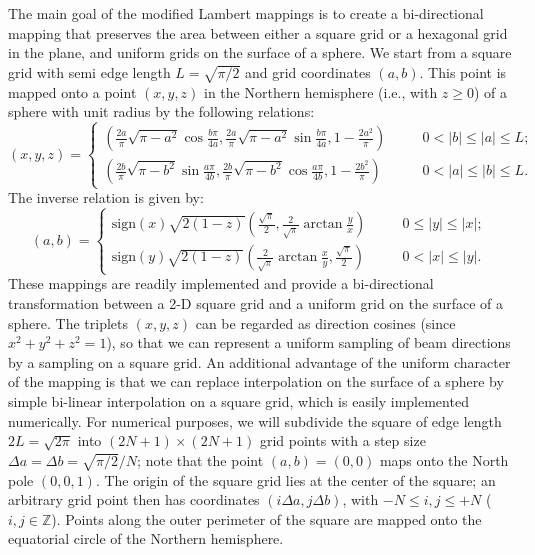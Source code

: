 \documentclass[DIV=calc, paper=letter, fontsize=11pt]{scrartcl}	 %
\begin{document}
The main goal of the modified Lambert mappings is to create a bi-directional mapping that preserves the area between either a square grid or a hexagonal
grid in the plane, and uniform grids on the surface of a sphere.  
We start from a square grid with semi edge length $L=\sqrt{\pi/2}$ and grid coordinates $(a,b)$.  This point is mapped onto a point $(x,y,z)$ 
in the Northern hemisphere (i.e., with $z\ge 0$) of a sphere with unit radius by the following relations:
\begin{equation}
	(x,y,z) = \left\{\begin{array}{lcl}
	\left(\frac{2a}{\pi}\sqrt{\pi-a^2}\cos\frac{b\pi}{4a},\frac{2a}{\pi}\sqrt{\pi-a^2}\sin\frac{b\pi}{4a},1-\frac{2a^2}{\pi}\right) & \quad & 0 < \vert b\vert \le\vert a\vert\le L;\\
	\left(\frac{2b}{\pi}\sqrt{\pi-b^2}\sin\frac{a\pi}{4b},\frac{2b}{\pi}\sqrt{\pi-b^2}\cos\frac{a\pi}{4b},1-\frac{2b^2}{\pi}\right) & \quad & 0 < \vert a\vert \le\vert b\vert\le L.
	\end{array}\right.
\end{equation}
The inverse relation is given by:
\begin{equation}
	(a,b) = \left\{\begin{array}{lcl}
	\text{sign}(x) \sqrt{2(1-z)}\left(\frac{\sqrt{\pi}}{2},\frac{2}{\sqrt{\pi}}\arctan\frac{y}{x}\right) & \quad & 0\le\vert y\vert\le\vert x\vert;\\
	\text{sign}(y) \sqrt{2(1-z)}\left(\frac{2}{\sqrt{\pi}}\arctan\frac{x}{y},\frac{\sqrt{\pi}}{2}\right) & \quad & 0<\vert x\vert\le\vert y\vert.
	\end{array}\right.
\end{equation}
These mappings are readily implemented and provide a bi-directional transformation between a 2-D square grid and a uniform grid on the surface of a sphere.
The triplets $(x,y,z)$ can be regarded as direction cosines (since $x^2+y^2+z^2=1$), so that we can represent a uniform sampling of beam directions by
a sampling on a square grid.  An additional advantage of the uniform character of the mapping is that we can replace interpolation on the 
surface of a sphere by simple bi-linear interpolation on a square grid, which is easily implemented numerically.
For numerical purposes, we will subdivide the square of edge length $2L=\sqrt{2\pi}$ into $(2N+1)\times (2N+1)$ grid points with a step size
$\Delta a=\Delta b=\sqrt{\pi/2}/N$; note that the point $(a,b)=(0,0)$ maps onto the North pole $(0,0,1)$.  The origin of the square grid lies
at the center of the square; an arbitrary grid point then has coordinates $(i\Delta a, j\Delta b)$, with $-N\le i,j \le +N$ ($i,j\in\mathbb{Z}$).  Points along 
the outer perimeter of the square are mapped onto the equatorial circle of the Northern hemisphere.
\end{document}
